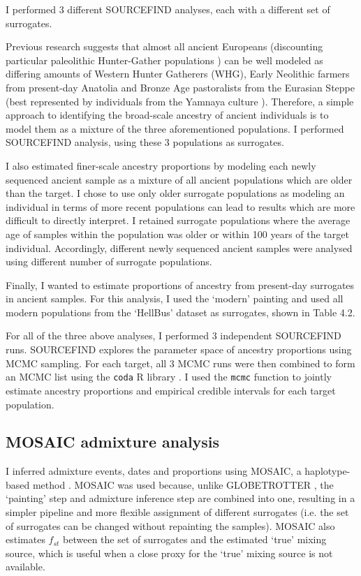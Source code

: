 I performed 3 different SOURCEFIND analyses, each with a different set of surrogates.

Previous research suggests that almost all ancient Europeans (discounting particular paleolithic Hunter-Gather populations \cite{Fu2016}) can be well modeled as differing amounts of Western Hunter Gatherers (WHG), Early Neolithic farmers from present-day Anatolia and Bronze Age pastoralists from the Eurasian Steppe (best represented by individuals from the Yamnaya culture \cite{Lazaridis2014}). Therefore, a simple approach to identifying the broad-scale ancestry of ancient individuals is to model them as a mixture of the three aforementioned populations. I performed SOURCEFIND analysis, using these 3 populations as surrogates.

I also estimated finer-scale ancestry proportions by modeling each newly sequenced ancient sample as a mixture of all ancient populations which are older than the target. I chose to use only older surrogate populations as modeling an individual in terms of more recent populations can lead to results which are more difficult to directly interpret. I retained surrogate populations where the average age of samples within the population was older or within 100 years of the target individual. Accordingly, different newly sequenced ancient samples were analysed using different number of surrogate populations. 

Finally, I wanted to estimate proportions of ancestry from present-day surrogates in ancient samples. For this analysis, I used the `modern' painting and used all modern populations from the `HellBus' dataset as surrogates, shown in Table 4.2.

For all of the three above analyses, I performed 3 independent SOURCEFIND runs. SOURCEFIND explores the parameter space of ancestry proportions using MCMC sampling. For each target, all 3 MCMC runs were then combined to form an MCMC list using the \texttt{coda} R library \cite{oro22547}. I used the \texttt{mcmc} function to jointly estimate ancestry proportions and empirical credible intervals for each target population. 

\subsection{MOSAIC admixture analysis}

I inferred admixture events, dates and proportions using MOSAIC, a haplotype-based method \cite{MOSAIC_2019}. MOSAIC was used because, unlike GLOBETROTTER \cite{Hellenthal2014}, the `painting' step and admixture inference step are combined into one, resulting in a simpler pipeline and more flexible assignment of different surrogates (i.e. the set of surrogates can be changed without repainting the samples). MOSAIC also estimates $f_{st}$ between the set of surrogates and the estimated `true' mixing source, which is useful when a close proxy for the `true' mixing source is not available. 

